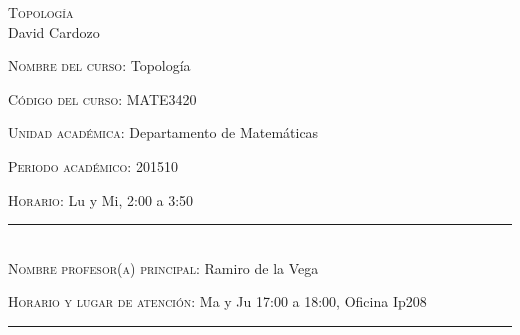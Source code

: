 \begin{center}
\textsc{\large  Topología }\\[0.1cm]
\large David Cardozo\\[0.5cm]
\end{center}	

\large \noindent\textsc{Nombre del curso:}  Topología%

\noindent\textsc{Código del curso:} MATE3420 %

\noindent\textsc{Unidad académica:} Departamento de Matemáticas

\noindent\textsc{Periodo acad\'emico:} 201510 %

\noindent\textsc{Horario:} Lu y Mi, 2:00 a 3:50%

\noindent\rule{\textwidth}{1pt}\\[-0.3cm]

\normalsize \noindent\textsc{Nombre profesor(a) principal:} Ramiro de la Vega%


\noindent\textsc{Horario y lugar de atenci\'on:} Ma y Ju 17:00 a
18:00, Oficina Ip208

\noindent\rule{\textwidth}{1pt}\\[-0.1cm]